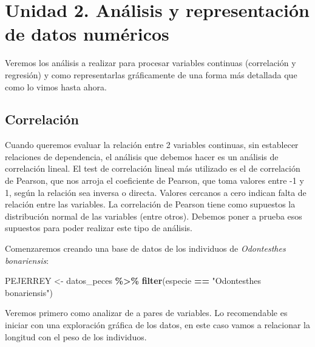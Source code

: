 \documentclass[
]{article}
\newenvironment{Shaded}{\begin{snugshade}}{\end{snugshade}}
\newcommand{\AttributeTok}[1]{\textcolor[rgb]{0.13,0.29,0.53}{#1}}
\newcommand{\CommentTok}[1]{\textcolor[rgb]{0.56,0.35,0.01}{\textit{#1}}}
\newcommand{\DecValTok}[1]{\textcolor[rgb]{0.00,0.00,0.81}{#1}}
\newcommand{\FunctionTok}[1]{\textcolor[rgb]{0.13,0.29,0.53}{\textbf{#1}}}
\newcommand{\NormalTok}[1]{#1}
\newcommand{\OtherTok}[1]{\textcolor[rgb]{0.56,0.35,0.01}{#1}}
\newcommand{\SpecialCharTok}[1]{\textcolor[rgb]{0.81,0.36,0.00}{\textbf{#1}}}
\newcommand{\StringTok}[1]{\textcolor[rgb]{0.31,0.60,0.02}{#1}}
\begin{document}
\section{Unidad 2. Análisis y representación de datos
numéricos}\label{unidad-2.-anuxe1lisis-y-representaciuxf3n-de-datos-numuxe9ricos}

Veremos los análisis a realizar para procesar variables continuas
(correlación y regresión) y como representarlas gráficamente de una
forma más detallada que como lo vimos hasta ahora.

\subsection{Correlación}\label{correlaciuxf3n}

Cuando queremos evaluar la relación entre 2 variables continuas, sin
establecer relaciones de dependencia, el análisis que debemos hacer es
un análisis de correlación lineal. El test de correlación lineal más
utilizado es el de correlación de Pearson, que nos arroja el coeficiente
de Pearson, que toma valores entre -1 y 1, según la relación sea inversa
o directa. Valores cercanos a cero indican falta de relación entre las
variables. La correlación de Pearson tiene como supuestos la
distribución normal de las variables (entre otros). Debemos poner a
prueba esos supuestos para poder realizar este tipo de análisis.

Comenzaremos creando una base de datos de los individuos de
\emph{Odontesthes bonariensis}:

\begin{Shaded}
\begin{Highlighting}[]
\NormalTok{PEJERREY }\OtherTok{\textless{}{-}}\NormalTok{ datos\_peces }\SpecialCharTok{\%\textgreater{}\%} \FunctionTok{filter}\NormalTok{(especie }\SpecialCharTok{==} \StringTok{"Odontesthes bonariensis"}\NormalTok{)}
\end{Highlighting}
\end{Shaded}

Veremos primero como analizar de a pares de variables. Lo recomendable
es iniciar con una exploración gráfica de los datos, en este caso vamos
a relacionar la longitud con el peso de los individuos.

\begin{Shaded}
\end{Shaded}
\end{document}
